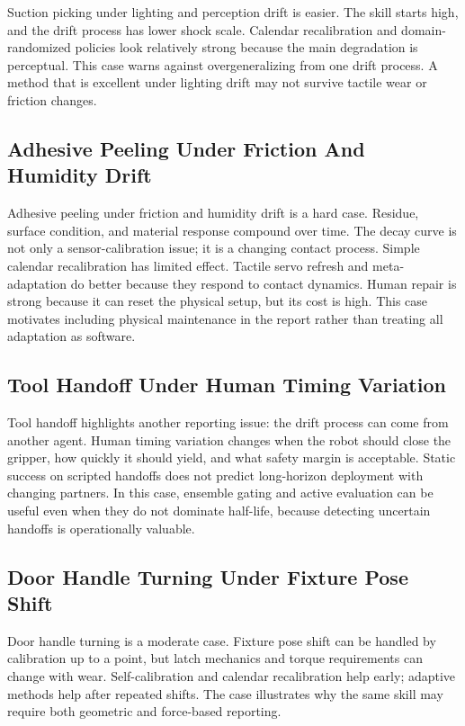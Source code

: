 \documentclass{article}
\begin{document}
Suction picking under lighting and perception drift is easier. The skill starts
high, and the drift process has lower shock scale. Calendar recalibration and
domain-randomized policies look relatively strong because the main degradation
is perceptual. This case warns against overgeneralizing from one drift process.
A method that is excellent under lighting drift may not survive tactile wear or
friction changes.

\subsection{Adhesive Peeling Under Friction And Humidity Drift}

Adhesive peeling under friction and humidity drift is a hard case. Residue,
surface condition, and material response compound over time. The decay curve is
not only a sensor-calibration issue; it is a changing contact process. Simple
calendar recalibration has limited effect. Tactile servo refresh and
meta-adaptation do better because they respond to contact dynamics. Human repair
is strong because it can reset the physical setup, but its cost is high. This
case motivates including physical maintenance in the report rather than
treating all adaptation as software.

\subsection{Tool Handoff Under Human Timing Variation}

Tool handoff highlights another reporting issue: the drift process can come
from another agent. Human timing variation changes when the robot should close
the gripper, how quickly it should yield, and what safety margin is acceptable.
Static success on scripted handoffs does not predict long-horizon deployment
with changing partners. In this case, ensemble gating and active evaluation can
be useful even when they do not dominate half-life, because detecting uncertain
handoffs is operationally valuable.

\subsection{Door Handle Turning Under Fixture Pose Shift}

Door handle turning is a moderate case. Fixture pose shift can be handled by
calibration up to a point, but latch mechanics and torque requirements can
change with wear. Self-calibration and calendar recalibration help early;
adaptive methods help after repeated shifts. The case illustrates why the same
skill may require both geometric and force-based reporting.
\end{document}
